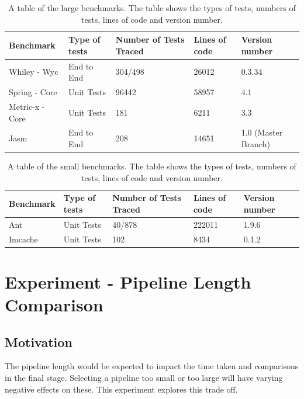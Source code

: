 \begin{table}[H]
\centering
\begin{tabular}{|l|l|l|l|l|}
\hline
{\bf Benchmark}    & {\bf Type of tests}   &  {\bf Number of Tests Traced} & {\bf Lines of code} & {\bf Version number}   \\ \hline
Whiley - Wyc      & End to End  &    304/498   &   26012       &       0.3.34   \\ \hline
Spring - Core   & Unit Tests  &  96442  &    58957      & 4.1 \\ \hline
Metric-x - Core &  Unit Tests  &  181 &    6211      & 3.3 \\ \hline
Jasm              &   End to End   &  208     &     14651     & 1.0 (Master Branch) \\ \hline

\end{tabular}
\caption{A table of the large benchmarks. The table shows the types of tests, numbers of tests, lines of code and version number.}
\label{large_test}
\end{table}

\begin{table}[H]
\centering
\begin{tabular}{|l|l|l|l|l|}
\hline
{\bf Benchmark} & {\bf Type of tests}   & {\bf Number of Tests Traced} & {\bf Lines of code} & {\bf Version number}  \\ \hline
Ant             &   Unit Tests    &     40/878     & 222011 & 1.9.6 \\ \hline
Imcache &       Unit Tests    &    102        & 8434  & 0.1.2 \\ \hline
\end{tabular}
\caption{A table of the small benchmarks. The table shows the types of tests, numbers of tests, lines of code and version number.}
\label{small_test}
\end{table}

\section{Experiment  - Pipeline Length Comparison }
\label{sec:pipelineEva}

\subsection{Motivation}
The pipeline length would be expected to impact the time taken and comparisons in the final stage. Selecting a pipeline too small or too large will have varying negative effects on these. This experiment explores this trade off.

